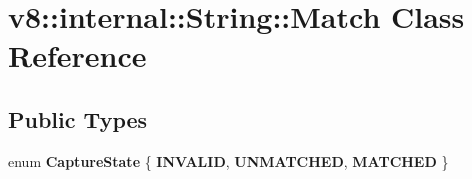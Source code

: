 \hypertarget{classv8_1_1internal_1_1String_1_1Match}{}\section{v8\+:\+:internal\+:\+:String\+:\+:Match Class Reference}
\label{classv8_1_1internal_1_1String_1_1Match}
\subsection*{Public Types}
\begin{DoxyCompactItemize}
\item 
\mbox{\label{classv8_1_1internal_1_1String_1_1Match_ada8b606fa3a85b7690b84fbc559ab01a}} 
enum {\bfseries Capture\+State} \{ {\bfseries I\+N\+V\+A\+L\+ID}, 
{\bfseries U\+N\+M\+A\+T\+C\+H\+ED}, 
{\bfseries M\+A\+T\+C\+H\+ED}
 \}
\end{DoxyCompactItemize}
